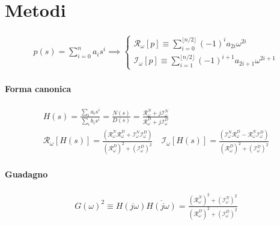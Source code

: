\section*{Metodi}

\begin{equation}
  \begin{gathered}
    p(s) = \sum_{i=0}^n a_is^i \implies
    \begin{cases}
      \mathcal{R}_{\omega}[p] \equiv \sum_{i=0}^{\lfloor n/2\rfloor} (-1)^ia_{2i}\omega^{2i} \\
      \mathcal{I}_{\omega}[p] \equiv \sum_{i=1}^{\lfloor n/2\rfloor} (-1)^{i+1}a_{2i+1}\omega^{2i+1}
    \end{cases}
  \end{gathered}
\end{equation}

\paragraph{Forma canonica}
\begin{equation}
  \label{eq:forma-canonica}
  \begin{gathered}
    H(s) = \frac{\sum_i a_is^i}{\sum_i b_is^i} = \frac{N(s)}{D(s)} = \frac{\mathcal{R}_{\omega}^N + j\mathcal{I}_{\omega}^N}{\mathcal{R}_{\omega}^D + j\mathcal{I}_{\omega}^D} \\
    \mathcal{R}_{\omega}[H(s)] = \frac{(\mathcal{R}_{\omega}^N\mathcal{R}_{\omega}^D + \mathcal{I}_{\omega}^N\mathcal{I}_{\omega}^D)}{(\mathcal{R}_{\omega}^D)^2 + (\mathcal{I}_{\omega}^D)^2} \quad
    \mathcal{I}_{\omega}[H(s)] = \frac{(\mathcal{I}_{\omega}^N\mathcal{R}_{\omega}^D - \mathcal{R}_{\omega}^N\mathcal{I}_{\omega}^D)}{(\mathcal{R}_{\omega}^D)^2 + (\mathcal{I}_{\omega}^D)^2}
  \end{gathered}
\end{equation}

\paragraph{Guadagno}
\begin{equation}
  \label{eq:da-tfunc-a-gain}
  \begin{gathered}
    G(\omega)^2 \equiv H(j\omega)\overline{H(j\omega)} = \frac{(\mathcal{R}_{\omega}^N)^2 + (\mathcal{I}_{\omega}^N)^2}{(\mathcal{R}_{\omega}^D)^2 + (\mathcal{I}_{\omega}^D)^2}
  \end{gathered}
\end{equation}


